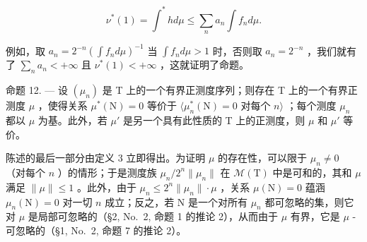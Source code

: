 \[
\nu^ {*} (1) = \int^ {*} h d \mu \leqslant \sum_ {n} a _ {n} \int f _ {n} d \mu .
\]

例如，取 \(a_{n} = 2^{-n}\left(\int f_{n}d\mu\right)^{-1}\) 当 \(\int f_n d\mu > 1\) 时，否则取 \(a_{n} = 2^{-n}\) ，我们就有了 \(\sum_{n}a_{n} < +\infty\) 且 \(\nu^{*}(1) < +\infty\) ，这就证明了命题。

命题 12. --- 设 \((\mu_n)\) 是 T 上的一个有界正测度序列；则存在 T 上的一个有界正测度 \(\mu\) ，使得关系 \(\mu^*(\mathrm{N}) = 0\) 等价于 \(\langle \mu_n^*(\mathrm{N}) = 0 \text{ 对每个 } n \rangle\) ；每个测度 \(\mu_n\) 都以 \(\mu\) 为基。此外，若 \(\mu'\) 是另一个具有此性质的 T 上的正测度，则 \(\mu\) 和 \(\mu'\) 等价。

陈述的最后一部分由定义 3 立即得出。为证明 \(\mu\) 的存在性，可以限于 \(\mu_n \neq 0\) （对每个 \(n\) ）的情形；于是测度族 \(\mu_n / 2^n \| \mu_n \|\) 在 \(\mathcal{M}(\mathrm{T})\) 中是可和的，其和 \(\mu\) 满足 \(\| \mu \| \leqslant 1\) 。此外，由于 \(\mu_n \leqslant 2^n \| \mu_n \| \cdot \mu\) ，关系 \(\mu(\mathrm{N}) = 0\) 蕴涵 \(\mu_n(\mathrm{N}) = 0\) 对一切 \(n\) 成立；反之，若 \(\mathrm{N}\) 是一个对所有 \(\mu_n\) 都可忽略的集，则它对 \(\mu\) 是局部可忽略的（§2, No.~2, 命题 1 的推论 2），从而由于 \(\mu\) 有界，它是 \(\mu\) -可忽略的（§1, No.~2, 命题 7 的推论 2）。


